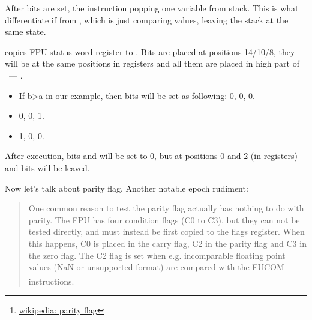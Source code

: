 {After bits are set, the \FCOMP instruction popping one variable from stack. 
This is what differentiate if from \FCOM, which is just comparing values, leaving the stack at the same state.}

{\FNSTSW copies FPU status word register to \AX. Bits \CThreeBits are placed at positions 14/10/8, 
they will be at the same positions in \AX registers and all them are placed in high part of \AX ~--- \AH.}

\begin{itemize}
\item
{}
{If b>a in our example, then \CThreeBits bits will be set as following:} 0, 0, 0.
\item
{} 0, 0, 1.
\item
{} 1, 0, 0.
\end{itemize}

{After  execution, bits \Cthree and  will be set to 0, 
but at positions 0 and 2 (in \AH registers) 
\Czero and \Ctwo bits will be leaved.}

{Now let's talk about parity flag. Another notable epoch rudiment}:

\begin{framed}
\begin{quotation}
One common reason to test the parity flag actually has nothing to do with parity. The FPU has four condition flags 
(C0 to C3), but they can not be tested directly, and must instead be first copied to the flags register. 
When this happens, C0 is placed in the carry flag, C2 in the parity flag and C3 in the zero flag. 
The C2 flag is set when e.g. incomparable floating point values (NaN or unsupported format) are compared 
with the FUCOM instructions.\footnote{\href{http://en.wikipedia.org/wiki/Parity_flag}{wikipedia: parity flag}}
\end{quotation}
\end{framed}

